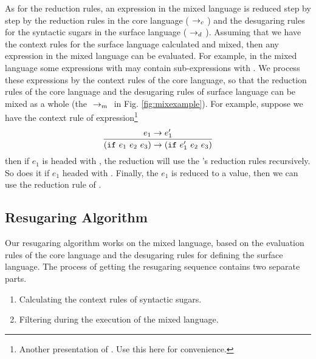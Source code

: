As for the reduction rules, an expression in the mixed language is reduced step by step by the reduction rules in the core language ($~\rightarrow_c~$) and the desugaring rules for the syntactic sugars in the surface language ($~\rightarrow_d~$). Assuming that we have the context rules for the surface language calculated and mixed, then any expression in the mixed language can be evaluated. For example, in the mixed language some expressions with  may contain sub-expressions with . We process these expressions by the context rules of the core language, so that the reduction rules of the core language and the desugaring rules of surface language can be mixed as a whole
 (the $~\rightarrow_m~$ in Fig. \ref{fig:mixexample}). For example, suppose we have the context rule of  expression\footnote{Another presentation of . Use this here for convenience.}
\[
\infer{(\m{if}~e_1~e_2~e_3) \rightarrow (\m{if}~e_1'~e_2~e_3)}{e_1 \rightarrow e_1'}
\]
then if $e_1$ is headed with , the reduction will use the 's reduction rules recursively. So does it if $e_1$ headed with . Finally, the $e_1$ is reduced to a value, then we can use the reduction rule of .


\subsection{Resugaring Algorithm}

Our resugaring algorithm works on the mixed language, based on the evaluation rules of the core language and the desugaring rules for defining the surface language. The process of  getting the resugaring sequence contains two separate parts.

\begin{enumerate}
\item Calculating the context rules of syntactic sugars.
\item Filtering  during the execution of the mixed language.
\end{enumerate}

